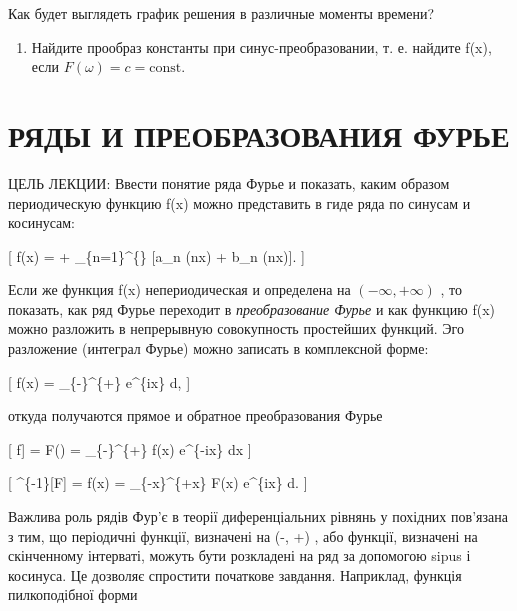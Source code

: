 \documentclass[
  ukrainian,
]{article}
\providecommand{\tightlist}{%
  \setlength{\itemsep}{0pt}\setlength{\parskip}{0pt}}
\begin{document}
Как будет выглядеть график решения в различные моменты времени?

\begin{enumerate}
\def\labelenumi{\arabic{enumi}.}
\setcounter{enumi}{4}
\tightlist
\item
  Найдите прообраз константы при синус-преобразовании, т. е. найдите
  f(x), если \(F(\omega) = c = \mathrm{const.}\)
\end{enumerate}

\section{РЯДЫ И ПРЕОБРАЗОВАНИЯ
ФУРЬЕ}\label{ux440ux44fux434ux44b-ux438-ux43fux440ux435ux43eux431ux440ux430ux437ux43eux432ux430ux43dux438ux44f-ux444ux443ux440ux44cux435}

ЦЕЛЬ ЛЕКЦИИ: Ввести понятие ряда Фурье и показать, каким образом
периодическую функцию f(x) можно представить в гиде ряда по синусам и
косинусам:

{[} f(x) =  + \sum\_\{n=1\}\^{}\{\infty\} {[}a\_n
\cos(n\pi x) + b\_n \sin(n\pi x){]}. {]}

Если же функция f(x) непериодическая и определена на
\((-\infty, +\infty)\) , то показать, как ряд Фурье переходит в
\emph{преобразование Фурье} и как функцию f(x) можно разложить в
непрерывную совокупность простейших функций. Эго разложение (интеграл
Фурье) можно записать в комплексной форме:

{[} f(x) =  \int\_\{-\infty\}\^{}\{+\infty\}
 e\^{}\{i\xi x\}
d\xi, {]}

откуда получаются прямое и обратное преобразования Фурье

{[} \mathcal{F}{[}f{]} = F(\xi) = 
\int\_\{-\infty\}\^{}\{+\infty\} f(x) e\^{}\{-i\xi x\} dx
\qquad {} {]}

{[} \^{}\{-1\}{[}F{]} = f(x) = 
\int\_\{-x\}\^{}\{+x\} F(x) e\^{}\{i\xi x\}
d\xi \qquad {}. {]}

Важлива роль рядів Фур'є в теорії диференціальних рівнянь у похідних
пов'язана з тим, що періодичні функції, визначені на (-\infty, +\infty)
, або функції, визначені на скінченному інтерваті, можуть бути
розкладені на ряд за допомогою sipus і косинуса. Це дозволяє спростити
початкове завдання. Наприклад, функція пилкоподібної форми
\end{document}
